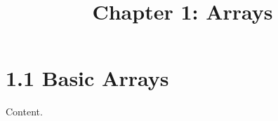 \documentclass{article}
\title{Chapter 1: Arrays}
\begin{document}
\section{1.1 Basic Arrays}
Content.
\end{document}
